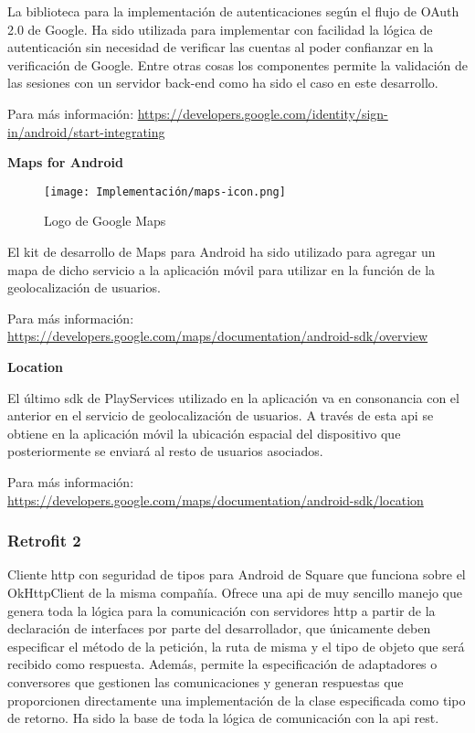 La biblioteca para la implementación de autenticaciones según el flujo de OAuth 2.0\cite{rfc6750} de Google. Ha sido utilizada para implementar con facilidad la lógica de autenticación sin necesidad de verificar las cuentas al poder confianzar en la verificación de Google. Entre otras cosas los componentes permite la validación de las sesiones con un servidor back-end como ha sido el caso en este desarrollo. 

Para más información: \href{https://developers.google.com/identity/sign-in/android/start-integrating}{https://developers.google.com/identity/sign-in/android/start-integrating}

\textbf{Maps for Android}
\label{lib:app:maps}

\begin{wrapfigure}[4]{r}{0.2\textwidth}
    \vspace{-70pt}
    \centering
    \texttt{[image: Implementación/maps-icon.png]}
    \vspace{-15pt}
    \caption{Logo de Google Maps}
\end{wrapfigure}

El kit de desarrollo de Maps para Android ha sido utilizado para agregar un mapa de dicho servicio a la aplicación móvil para utilizar en la función de la geolocalización de usuarios.

Para más información: \href{https://developers.google.com/maps/documentation/android-sdk/overview}{https://developers.google.com/maps/documentation/android-sdk/overview}

\textbf{Location}

El último \acrshort{sdk} de PlayServices utilizado en la aplicación va en consonancia con el anterior en el servicio de geolocalización de usuarios. A través de esta \acrshort{api} se obtiene en la aplicación móvil la ubicación espacial del dispositivo que posteriormente se enviará al resto de usuarios asociados.

Para más información: \href{https://developers.google.com/maps/documentation/android-sdk/location}{https://developers.google.com/maps/documentation/android-sdk/location}

\subsubsection{Retrofit 2}
\label{lib:app:retrofit2}

Cliente \acrshort{http} con seguridad de tipos para Android de Square que funciona sobre el OkHttpClient de la misma compañía. Ofrece una \acrshort{api} de muy sencillo manejo que genera toda la lógica para la comunicación con servidores \acrshort{http} a partir de la declaración de interfaces por parte del desarrollador, que únicamente deben especificar el método de la petición, la ruta de misma y el tipo de objeto que será recibido como respuesta. Además, permite la especificación de adaptadores o conversores que gestionen las comunicaciones y generan respuestas que proporcionen directamente una implementación de la clase especificada como tipo de retorno. Ha sido la base de toda la lógica de comunicación con la \acrshort{api} \acrshort{rest}.

